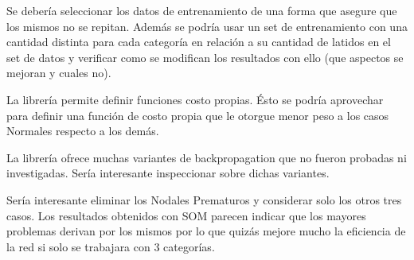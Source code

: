 \documentclass[conference]{IEEEtran}
\theoremstyle{definition}
\begin{document}
Se deber\'{i}a seleccionar los datos de entrenamiento de una forma que asegure que los mismos no se repitan. Adem\'{a}s se podr\'{i}a usar un set de entrenamiento con una cantidad distinta para cada categor\'{i}a en relaci\'{o}n a su cantidad de latidos en el set de datos y verificar como se modifican los resultados con ello (que aspectos se mejoran y cuales no).

La librer\'{i}a permite definir funciones costo propias. \'{E}sto se podr\'{i}a aprovechar para definir una funci\'{o}n de costo propia que le otorgue menor peso a los casos Normales respecto a los dem\'{a}s.

La librer\'{i}a ofrece muchas variantes de backpropagation que no fueron probadas ni investigadas. Ser\'{i}a interesante inspeccionar sobre dichas variantes.

Ser\'{i}a interesante eliminar los Nodales Prematuros y considerar solo los otros tres casos. Los resultados obtenidos con SOM parecen indicar que los mayores problemas derivan por los mismos por lo que quiz\'{a}s mejore mucho la eficiencia de la red si solo se trabajara con 3 categor\'{i}as.

\IEEEpeerreviewmaketitle

\newpage



\end{document}
